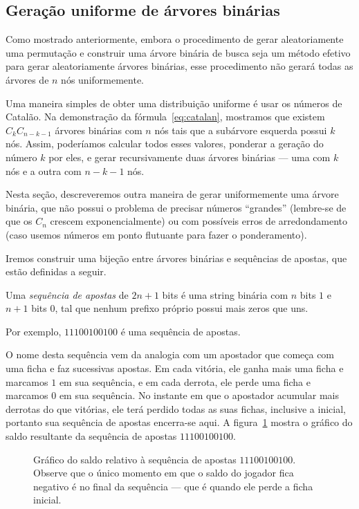 \subsection{Geração uniforme de árvores binárias}

Como mostrado anteriormente,
embora o procedimento de gerar aleatoriamente uma permutação
e construir uma árvore binária de busca
seja um método efetivo para gerar aleatoriamente árvores binárias,
esse procedimento não gerará todas as árvores de $n$ nós uniformemente.

Uma maneira simples de obter uma distribuição uniforme
é usar os números de Catalão.
Na demonstração da fórmula~\ref{eq:catalan},
mostramos que existem $C_k C_{n-k-1}$ árvores binárias com $n$ nós
tais que a subárvore esquerda possui $k$ nós.
Assim,
poderíamos calcular todos esses valores,
ponderar a geração do número $k$ por eles,
e gerar recursivamente duas árvores binárias
--- uma com $k$ nós e a outra com $n - k - 1$ nós.

Nesta seção,
descreveremos outra maneira de gerar uniformemente uma árvore binária,
que não possui o problema de precisar números ``grandes''
(lembre-se de que os $C_n$ crescem exponencialmente)
ou com possíveis erros de arredondamento
(caso usemos números em ponto flutuante para fazer o ponderamento).

Iremos construir uma bijeção entre árvores binárias e sequências de apostas,
que estão definidas a seguir.

\begin{definition}
    Uma \emph{sequência de apostas} de $2n+1$ bits
    é uma string binária com $n$ bits $1$ e $n+1$ bits $0$,
    tal que
    nenhum prefixo próprio possui mais zeros que uns.
\end{definition}

Por exemplo, $11100100100$ é uma sequência de apostas.

O nome desta sequência vem da analogia com um apostador
que começa com uma ficha e faz sucessivas apostas.
Em cada vitória, ele ganha mais uma ficha e marcamos $1$ em sua sequência,
e em cada derrota, ele perde uma ficha e marcamos $0$ em sua sequência.
No instante em que o apostador acumular mais derrotas do que vitórias,
ele terá perdido todas as suas fichas, inclusive a inicial,
portanto sua sequência de apostas encerra-se aqui.
A figura~\ref{fig:apostas}
mostra o gráfico do saldo resultante da sequência de apostas $11100100100$.

\begin{figure}[h]
    \centering
    \caption{
        Gráfico do saldo relativo à sequência de apostas $11100100100$.
        Observe que o único momento em que o saldo do jogador fica negativo
        é no final da sequência
        --- que é quando ele perde a ficha inicial.
    }
    \label{fig:apostas}
\end{figure}
